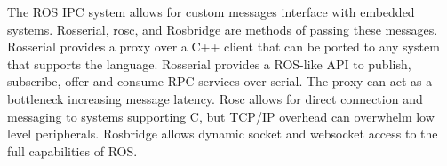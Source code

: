 The ROS IPC system allows for custom messages interface with embedded systems. Rosserial, rosc, and Rosbridge are methods of passing these messages\cite{EDUROS, EMBEDDEDROS}. Rosserial provides a proxy over a C++ client that can be ported to any system that supports the language. Rosserial provides a ROS-like API to publish, subscribe, offer and consume RPC services over serial. The proxy can act as a bottleneck increasing message latency. Rosc allows for direct connection and messaging to systems supporting C, but TCP/IP overhead can overwhelm low level peripherals. Rosbridge allows dynamic socket and websocket access to the full capabilities of ROS\cite{EMBEDDEDROS}.







